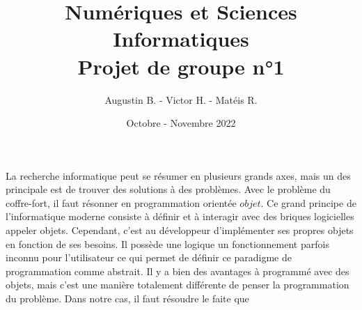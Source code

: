 \documentclass{article}
\title{Numériques et Sciences Informatiques \\ Projet de groupe n°1}
\author{Augustin B. - Victor H. - Matéis R.}
\date{Octobre - Novembre 2022}
\begin{document}
    \maketitle
    
    La recherche informatique peut se résumer en plusieurs grands axes, mais un des principale est de trouver des solutions à des problèmes. Avec le problème du coffre-fort, il faut résonner en programmation orientée $objet$. Ce grand principe de l'informatique moderne consiste à définir et à interagir avec des briques logicielles appeler objets. Cependant, c'est au développeur d'implémenter ses propres objets en fonction de ses besoins. Il possède une logique un fonctionnement parfois inconnu pour l'utilisateur ce qui permet de définir ce paradigme de programmation comme abstrait. Il y a bien des avantages à programmé avec des objets, mais c'est une manière totalement différente de penser la programmation du problème.
    Dans notre cas, il faut résoudre le faite que 
\end{document}
